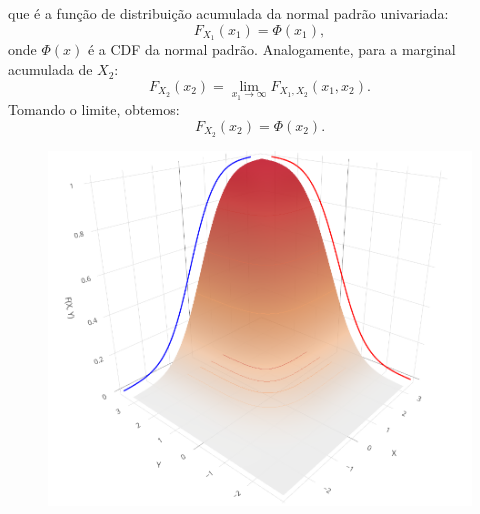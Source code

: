 \begin{frame}
	\begin{block}{}
			que é a função de distribuição acumulada da normal padrão univariada:
		\[
		F_{X_1}(x_1) = \Phi(x_1),
		\]
		onde \( \Phi(x) \) é a CDF da normal padrão. 
		Analogamente, para a marginal acumulada de \( X_2 \):
		\[
		F_{X_2}(x_2) = \lim_{x_1 \to \infty} F_{X_1, X_2}(x_1, x_2).
		\]
		Tomando o limite, obtemos:
		\[
		F_{X_2}(x_2) = \Phi(x_2).
		\]
		\end{block}
		

			\begin{figure}[!htb]
				\begin{center}
					\includegraphics[scale=0.18]{Bivariate.png}
				\end{center}
			\end{figure}
			
			
\end{frame}	



%	
%



